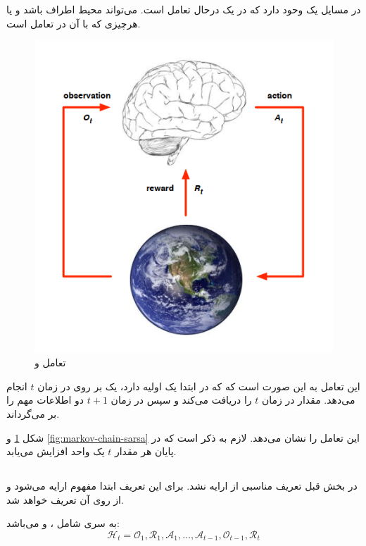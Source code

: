  در مسایل  یک 
 \textbf{}
 وحود دارد که در یک \textbf{} درحال تعامل است.  می‌تواند محیط اطراف  باشد و یا هرچیزی که  با آن در تعامل است.
  \cite{uclRL}
\begin{figure}[t]
	\centering
	\includegraphics[width=0.7\linewidth]{Figures/RL/Enviroment-brain-as-agent}
	\caption{تعامل  و }
	\label{fig:enviroment-brain-as-agent}
\end{figure}

این تعامل به این صورت است که  که در ابتدا یک  اولیه دارد، یک  بر روی  در زمان $t$ انجام می‌دهد. 
 مقدار  در زمان $t$ را دریافت می‌کند و 
سپس  در زمان $t+1$ دو اطلاعات مهم را بر می‌گرداند. 
\begin{alphinline}
	\item {}
	\item {}
\end{alphinline}

شکل 
\ref{fig:enviroment-brain-as-agent}
و \ref{fig:markov-chain-sarsa}
این تعامل را نشان می‌دهد. لازم به ذکر است که در پایان هر  مقدار $t$ یک واحد افزایش می‌یابد.

\subsection{}
در بخش قبل تعریف مناسبی از  ارایه نشد. برای این تعریف ابتدا مفهوم  ارایه می‌شود و از روی آن  تعریف خواهد شد.

\begin{definition}[\w{history}]
	به سری شامل ،  و  می‌باشد:
	\[
	\mathcal{H}_t = \mathcal{O}_1 ,\mathcal{R}_1, \mathcal{A}_1, \dots, \mathcal{A}_{t-1}, \mathcal{O}_{t-1}, \mathcal{R}_t
	\]
\end{definition}


